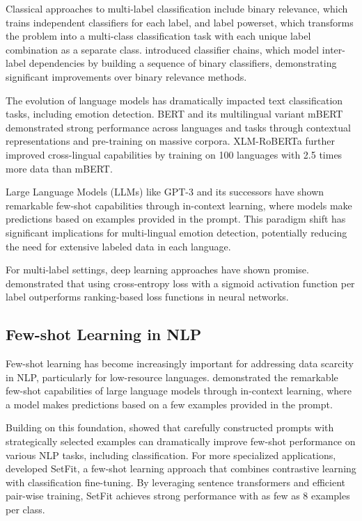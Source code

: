 \documentclass[a4paper,12pt]{extarticle}
\begin{document}
Classical approaches to multi-label classification include binary relevance, which trains independent classifiers for each label, and label powerset, which transforms the problem into a multi-class classification task with each unique label combination as a separate class. \cite{read2011classifier} introduced classifier chains, which model inter-label dependencies by building a sequence of binary classifiers, demonstrating significant improvements over binary relevance methods.

The evolution of language models has dramatically impacted text classification tasks, including emotion detection. BERT \cite{devlin2019bert} and its multilingual variant mBERT demonstrated strong performance across languages and tasks through contextual representations and pre-training on massive corpora. XLM-RoBERTa \cite{conneau2020unsupervised} further improved cross-lingual capabilities by training on 100 languages with 2.5 times more data than mBERT.

Large Language Models (LLMs) like GPT-3 \cite{brown2020language} and its successors have shown remarkable few-shot capabilities through in-context learning, where models make predictions based on examples provided in the prompt. This paradigm shift has significant implications for multi-lingual emotion detection, potentially reducing the need for extensive labeled data in each language.

For multi-label settings, deep learning approaches have shown promise. \cite{nam2014large} demonstrated that using cross-entropy loss with a sigmoid activation function per label outperforms ranking-based loss functions in neural networks. 

\subsection{Few-shot Learning in NLP}

Few-shot learning has become increasingly important for addressing data scarcity in NLP, particularly for low-resource languages. \cite{brown2020language} demonstrated the remarkable few-shot capabilities of large language models through in-context learning, where a model makes predictions based on a few examples provided in the prompt.

Building on this foundation, \cite{gao2021making} showed that carefully constructed prompts with strategically selected examples can dramatically improve few-shot performance on various NLP tasks, including classification. For more specialized applications, \cite{tunstall2022efficient} developed SetFit, a few-shot learning approach that combines contrastive learning with classification fine-tuning. By leveraging sentence transformers and efficient pair-wise training, SetFit achieves strong performance with as few as 8 examples per class.
\end{document}
